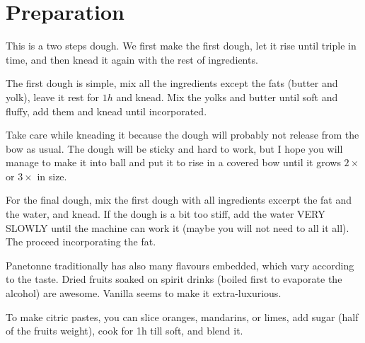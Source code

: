 \section{Preparation}

This is a two steps dough. We first make the first dough, let it rise until triple in time, and then knead it again with the rest of ingredients.

The first dough is simple, mix all the ingredients except the fats (butter and yolk), leave it rest for $1h$ and knead. 
%
Mix the yolks and butter until soft and fluffy, add them and knead until incorporated.

Take care while kneading it because the dough will probably not release from the bow as usual.
%
The dough will be sticky and hard to work, but I hope you will manage to make it into ball and put it to rise in a covered bow until it grows $2\times$ or $3\times$ in size.

For the final dough, mix the first dough with all ingredients \color{red}excerpt the fat and the water\color{black}, and  knead.
%
If the dough is a bit too stiff, add the water VERY SLOWLY until the machine can work it (maybe you will not need to all it all).
%
The proceed incorporating the fat.




Panetonne traditionally has also many flavours embedded, which vary according to the taste.
%
Dried fruits soaked on spirit drinks (boiled first to evaporate the alcohol) are awesome. Vanilla seems to make it extra-luxurious.

To make citric pastes, you can slice oranges, mandarins, or limes, add sugar (half of the fruits weight), cook for 1h till soft, and blend it.

